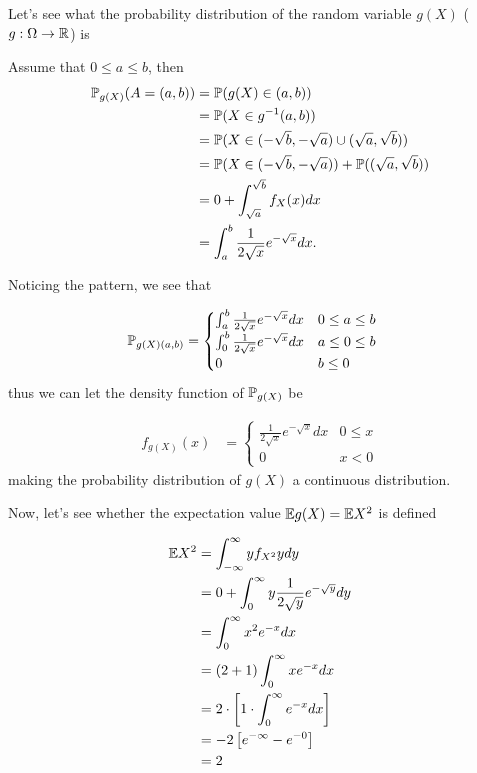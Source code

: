 
Let's see what the probability distribution of the random variable $ g(X)$ ($ g: \Omega \to \R$) is 

Assume that $ 0 \leq a \leq b$, then
\begin{align*}
\P_{g(X)} (A = (a,b)) &= \P( g(X) \in (a,b))\\
			  &= \P( X \in g^{-1} (a,b))\\
			  &= \P( X \in (-\sqrt{b}, -\sqrt{a}) \cup (\sqrt{a}, \sqrt{b}))\\
			  &= \P(X \in (-\sqrt{b}, -\sqrt{a})) + \P((\sqrt{a}, \sqrt{b}))\\
			  &= 0 + \int_{\sqrt{a}}^{\sqrt{b}} f_{X} (x) dx\\
			  &= \int_{a}^{b} \frac{1}{2\sqrt{x}} e^{-\sqrt{x}} dx.
\end{align*}

Noticing the pattern, we see that

\begin{align*}
    \P_{g(X) (a,b)} &= \begin{cases}
	\int_{a}^{b} \frac{1}{2\sqrt{x}} e^{-\sqrt{x}} dx & 0 \leq a \leq b\\
	\int_{0}^{b} \frac{1}{2\sqrt{x}} e^{-\sqrt{x}} dx & a \leq 0 \leq b\\
	0						  &  b \leq 0
    \end{cases}  
\end{align*}
thus we can let the density function of $ \P_{g(X)} $ be

\begin{align*}
    f_{g(X)} (x) &= \begin{cases}
	\frac{1}{2\sqrt{x}} e^{-\sqrt{x}} dx & 0 \leq x\\
	0				     & x < 0 
    \end{cases}  
\end{align*}
making the probability distribution of $ g(X)$ a continuous distribution.

Now, let's see whether the expectation value $ \E g(X) = \E X^2$ is defined

\begin{align*}
    \E X^2 &= \int_{-\infty}^{\infty} y f_{X^2} y dy\\
	   &= 0 + \int_{0}^{\infty} y \frac{1}{2\sqrt{y}} e^{-\sqrt{y}} dy\\
	   &= \int_{0}^{\infty} x^2 e ^{-x} dx\\
	   &= (2+1) \int_{0}^{\infty} x e^{-x} dx\\
	   &= 2 \cdot \left[ 1 \cdot  \int_{0}^{\infty} e^{-x}dx \right] \\
	   &= -2 \left[ e^{-\infty} - e^{-0}  \right] \\
	   &= 2
\end{align*}

